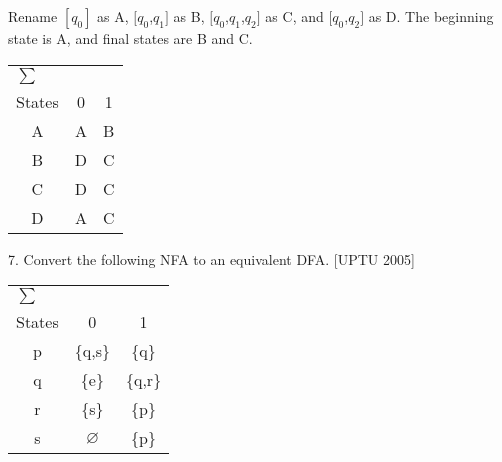 \documentclass [10pt,a4paper,tikz] {book}
\let\emptyset\varnothing
\begin{document}
Rename $[{q}_{0}]$ as A, $[{q}_{0}$,${q}_{1 }]$ as B, $[{q}_{0}$,${q}_{1}$,${q}_{2}]$ as C, and $[{q}_{0}$,${q}_{2}]$ as D. The beginning state is A, and
final states are B and C.

\begin{center}

\begin{tabular}{ccc}
\toprule
\multicolumn{3}{l}{$\sum$} \\
\cmidrule(r){1-1}
 States & 0 & 1 \\
    \midrule
    A & A & B \\
    B & D & C \\
    C & D & C \\
    D & A & C \\

    \bottomrule


\end{tabular}

\end{center}

7. Convert the following NFA to an equivalent DFA.
[UPTU 2005]

\begin{center}

\begin{tabular}{ccc}


\toprule
\multicolumn{3}{l}{$\sum$} \\
\cmidrule(r){1-1}
 States & 0 & 1 \\
    \midrule
    p & \{q,s\} & \{q\} \\
    q & \{e\} & \{q,r\} \\
    r & \{s\} & \{p\} \\
    s & $\emptyset$ & \{p\} \\

    \bottomrule


\end{tabular}

\end{center}
\end{document}
